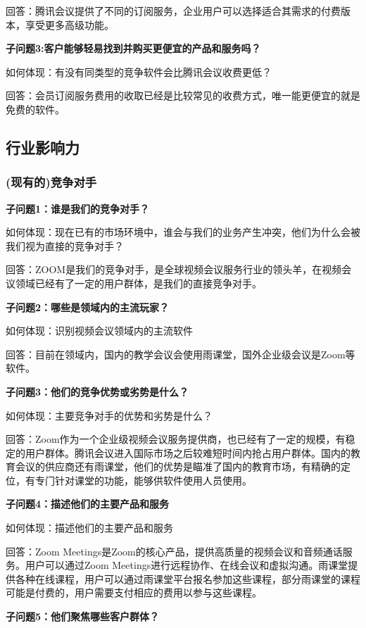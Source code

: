 \documentclass[a4paper,12pt]{article}
\begin{document}
    回答：腾讯会议提供了不同的订阅服务，企业用户可以选择适合其需求的付费版本，享受更多高级功能。
    
    \textbf{子问题3:客户能够轻易找到并购买更便宜的产品和服务吗？}

    如何体现：有没有同类型的竞争软件会⽐腾讯会议收费更低？

    回答：会员订阅服务费用的收取已经是⽐较常⻅的收费⽅式，唯⼀能更便宜的就是免费的软件。
    
    \subsection{行业影响力}
    \subsubsection{(现有的)竞争对手}
    \textbf{子问题1：谁是我们的竞争对手？}

    如何体现：现在已有的市场环境中，谁会与我们的业务产⽣冲突，他们为什么会被我们视为直接的竞争对⼿？

    回答：ZOOM是我们的竞争对⼿，是全球视频会议服务⾏业的领头⽺，在视频会议领域已经有了⼀定的⽤户群体，是我们的直接竞争对⼿。
    

    \textbf{子问题2：哪些是领域内的主流玩家？}

    如何体现：识别视频会议领域内的主流软件

    回答：⽬前在领域内，国内的教学会议会使⽤⾬课堂，国外企业级会议是Zoom等软件。
    
    \textbf{子问题3：他们的竞争优势或劣势是什么？}

    如何体现：主要竞争对⼿的优势和劣势是什么？

    回答：Zoom作为⼀个企业级视频会议服务提供商，也已经有了⼀定的规模，有稳定的⽤户群体。腾讯会议进⼊国际市场之后较难短时间内抢占⽤户群体。国内的教育会议的供应商还有⾬课堂，他们的优势是瞄准了国内的教育市场，有精确的定位，有专⻔针对课堂的功能，能够供软件使⽤⼈员使⽤。
    
    \textbf{子问题4：描述他们的主要产品和服务}

    如何体现：描述他们的主要产品和服务

    回答：Zoom Meetings是Zoom的核心产品，提供高质量的视频会议和音频通话服务。用户可以通过Zoom Meetings进行远程协作、在线会议和虚拟沟通。雨课堂提供各种在线课程，用户可以通过雨课堂平台报名参加这些课程，部分雨课堂的课程可能是付费的，用户需要支付相应的费用以参与这些课程。
    
    \textbf{子问题5：他们聚焦哪些客户群体？}
\end{document}
